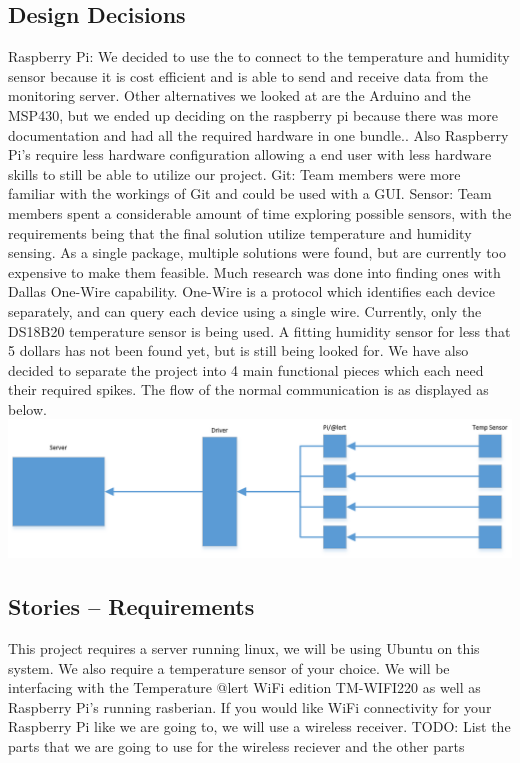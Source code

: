 \documentclass{report}
\begin{document}
\subsection*{Design Decisions}
Raspberry Pi: We decided to use the to connect to the temperature and humidity sensor because it is cost efficient and is able to send and receive data from the monitoring server. Other alternatives we looked at are the Arduino and the MSP430, but we ended up deciding on the raspberry pi because there was more documentation and had all the required hardware in one bundle.. Also Raspberry Pi’s require less hardware configuration allowing a end user with less hardware skills to still be able to utilize our project.
Git: Team members were more familiar with the workings of Git and could be used with a GUI.
Sensor: Team members spent a considerable amount of time exploring possible sensors, with the requirements being that the final solution utilize temperature and humidity sensing. As a single package, multiple solutions were found, but are currently too expensive to make them feasible. Much research was done into finding ones with Dallas One-Wire capability. One-Wire is a protocol which identifies each device separately, and can query each device using a single wire. Currently, only the DS18B20 temperature sensor is being used. A fitting humidity sensor for less that 5 dollars has not been found yet, but is still being looked for.
We have also decided to separate the project into 4 main functional pieces which each need their required spikes. The flow of the normal communication is as displayed as below.
\includegraphics{DataFlowFlowChart.PNG}
\newpage
\subsection*{Stories -- Requirements}
	This project requires a server running linux, we will be using Ubuntu on this system. We also require a temperature sensor of your choice. We will be interfacing with the Temperature @lert WiFi edition TM-WIFI220 as well as Raspberry Pi’s running rasberian. If you would like WiFi connectivity for your Raspberry Pi like we are going to, we will use a wireless receiver.
	TODO: List the parts that we are going to use for the wireless reciever and the other parts
\end{document}
